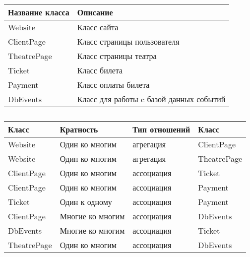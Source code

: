 \begin{table}[h!tp]
	\centering
	\caption{}
	\label{tabular:descriptions}
	\begin{tabular}{|p{}|p{}|}
		\hline \textbf{Название класса} & \textbf{Описание} \\ \hline
		Website & Класс сайта \\ \hline
		ClientPage & Класс страницы пользователя \\ \hline
		TheatrePage & Класс страницы театра \\ \hline
		Ticket & Класс билета \\ \hline
		Payment & Класс оплаты билета \\ \hline
		DbEvents & Класс для работы c базой данных событий \\ \hline
	\end{tabular}
\end{table}

\begin{longtable}{|p{}
	|p{}
	|p{}
	|p{}
	|}
	\caption{}
	\label{tabular:interactions}\\

	\hline \textbf{Класс} & \textbf{Кратность}
		& \textbf{Тип отношений} & \textbf{Класс} \\ \hline
	\endhead

	Website & Один ко многим & агрегация & ClientPage \\ \hline
	Website & Один ко многим & агрегация & TheatrePage \\ \hline
	ClientPage & Один ко многим & ассоциация & Ticket \\ \hline
	ClientPage & Один ко многим  & ассоциация & Payment \\ \hline
	Ticket & Один к одному & ассоциация & Payment \\ \hline
	ClientPage & Многие ко многим & ассоциация & DbEvents \\ \hline
	DbEvents & Многие ко многим & ассоциация & Ticket \\ \hline
	TheatrePage & Один ко многим & ассоциация & DbEvents \\ \hline
\end{longtable}

